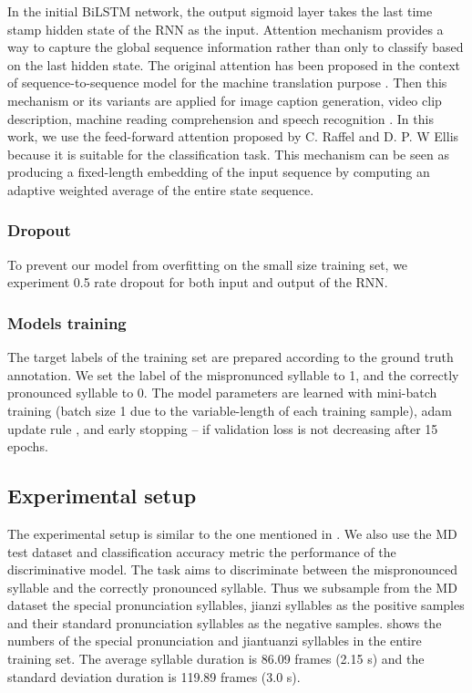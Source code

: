 In the initial \gls{BiLSTM} network, the output sigmoid layer takes the last time stamp hidden state of the \gls{RNN} as the input. Attention mechanism provides a way to capture the global sequence information rather than only to classify based on the last hidden state. The original attention has been proposed in the context of sequence-to-sequence model for the machine translation purpose \cite{Bahdanau2014}. Then this mechanism or its variants are applied for image caption generation, video clip description, machine reading comprehension and speech recognition \cite{Cho2015,Xu2015,Hermann2015}. In this work, we use the feed-forward attention proposed by C. Raffel and D. P. W Ellis \cite{Raffel2015} because it is suitable for the classification task. This mechanism can be seen as producing a fixed-length embedding of the input sequence by computing an adaptive
weighted average of the entire state sequence.

\subsubsection{Dropout}

To prevent our model from overfitting on the small size training set, we experiment 0.5 rate dropout for both input and output of the \gls{RNN}.

\subsubsection{Models training}

The target labels of the training set are prepared according to the ground truth annotation. We set the label of the mispronunced syllable to 1, and the correctly pronounced syllable to 0. The model parameters are learned with mini-batch training (batch size 1 due to the variable-length of each training sample), adam update rule \cite{kingma2014adam}, and early stopping -- if validation loss is not decreasing after 15 epochs. 

\subsection{Experimental setup}\label{sec:ch6:experimental_setup}

The experimental setup is similar to the one mentioned in . We also use the \gls{MD} test dataset and classification accuracy metric the performance of the discriminative model. The task aims to discriminate between the mispronounced syllable and the correctly pronounced syllable. Thus we subsample from the \gls{MD} dataset the special pronunciation syllables, \gls{jianzi} syllables as the positive samples and their standard pronunciation syllables as the negative samples.  shows the numbers of the special pronunciation and \gls{jiantuanzi} syllables in the entire training set. The average syllable duration is 86.09 frames (2.15 s) and the standard deviation duration is 119.89 frames (3.0 s). 

